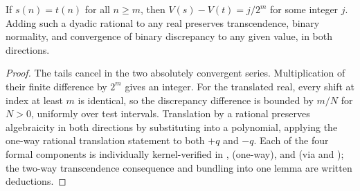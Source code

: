 \documentclass[11pt]{article}
\begin{document}
\begin{lemma}\label{lem:edit}
If \(s(n)=t(n)\) for all \(n\ge m\), then \(V(s)-V(t)=j/2^m\) for some integer \(j\). Adding such a dyadic rational to any real preserves transcendence, binary normality, and convergence of binary discrepancy to any given value, in both directions.
\end{lemma}
\begin{proof}
The tails cancel in the two absolutely convergent series. Multiplication of their finite difference by \(2^m\) gives an integer. For the translated real, every shift at index at least \(m\) is identical, so the discrepancy difference is bounded by \(m/N\) for \(N>0\), uniformly over test intervals. Translation by a rational preserves algebraicity in both directions by substituting into a polynomial, applying the one-way rational translation statement to both \(+q\) and \(-q\). Each of the four formal components is individually kernel-verified in
,
 (one-way),
and  (via  and ); the two-way transcendence consequence and bundling into one lemma are written deductions.
\end{proof}
\end{document}
